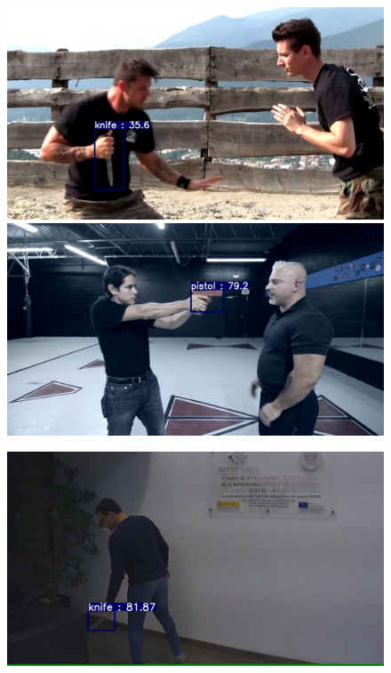 \documentclass[a4paper]{article}
\begin{document}
\begin{figure}[h]
\begin{multicols}{2}
	\end{multicols}
	\begin{multicols}{2}
		\includegraphics[width=1.\linewidth]{fig/SOHAS_561}
		\includegraphics[width=1.\linewidth]{fig/SOHAS_653}
	\end{multicols}
	\begin{multicols}{2}
		\includegraphics[width=1.\linewidth]{fig/SOHAS_1}

\end{multicols}
\end{figure}
\end{document}
